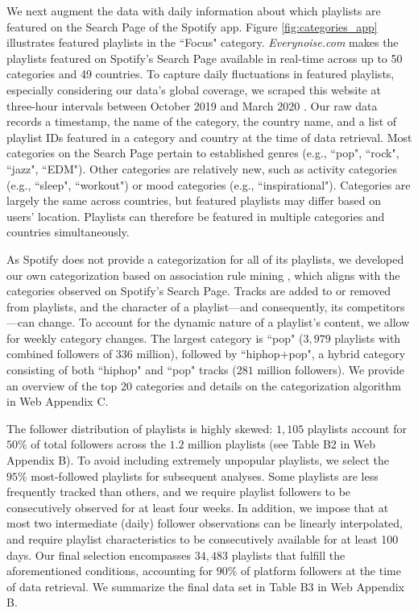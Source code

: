 \documentclass[12pt, a4paper, leqno]{article}
\begin{document}
We next augment the data with daily information about which playlists are featured on the Search Page of the Spotify app. Figure \ref{fig:categories_app} illustrates featured playlists in the ``Focus" category. 
\textit{Everynoise.com} makes the playlists featured on Spotify's Search Page available in real-time across up to 50 categories and 49 countries. To capture daily fluctuations in featured playlists, especially considering our data's global coverage, we 
scraped this website at three-hour intervals between October 2019 and March 2020 \citep[]{scraping}.  
Our raw data records a timestamp, the name of the category, the country name, and a list of playlist IDs featured in a category and country at the time of data retrieval. 
Most categories on the Search Page pertain to established genres (e.g., ``pop", ``rock", ``jazz", ``EDM"). Other categories are relatively new, such as activity categories (e.g., ``sleep", ``workout") or mood categories (e.g., ``inspirational"). 
Categories are largely the same across countries, but featured playlists may differ based on users' location. Playlists can therefore be featured in multiple categories and countries simultaneously. 

As Spotify does not provide a categorization for all of its playlists, we developed our own categorization based on association rule mining \citep{hastie_09}, which aligns with the categories observed on Spotify’s Search Page. Tracks are added to or removed from playlists, and the character of a playlist---and consequently, its competitors---can change. To account for the dynamic nature of a playlist's content, we allow for weekly category changes. The largest category is ``pop" ($3,979$ playlists with combined followers of $336$ million), followed by ``hiphop+pop", a hybrid category consisting of both ``hiphop" and ``pop" tracks ($281$ million followers). We provide an overview of the top 20 categories and details on the categorization algorithm in Web Appendix C.

The follower distribution of playlists is highly skewed: $1,105$ playlists account for $50\%$ of total followers across the $1.2$ million playlists (see Table B2 in Web Appendix B). To avoid including extremely unpopular playlists, we select the $95\%$ most-followed playlists for subsequent analyses. Some playlists are less frequently tracked than others, and we require playlist followers to be consecutively observed for at least four weeks. In addition, we impose that at most two intermediate (daily) follower observations can be linearly interpolated, and require playlist characteristics to be consecutively available for at least 100 days. Our final selection encompasses $34,483$ playlists that fulfill the aforementioned conditions, accounting for $90\%$ of platform followers at the time of data retrieval. We summarize the final data set in Table B3 in Web Appendix B.
\end{document}

